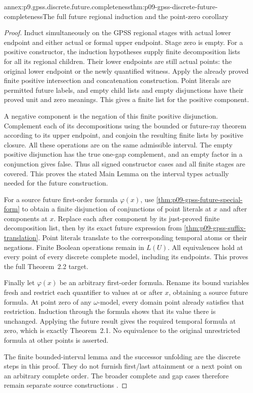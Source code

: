 \begin{annexitem}{annex:p9.gpss.discrete.future.completeness}{thm:p09-gpss-discrete-future-completeness}{The full future regional induction and the point-zero corollary}
\begin{proof}
Induct simultaneously on the GPSS
regional stages with actual lower
endpoint and either actual or
formal upper endpoint. Stage zero
is empty. For a positive
constructor, the induction hypotheses
supply finite decomposition lists
for all its regional children.
Their lower endpoints are still
actual points: the original
lower endpoint or the newly
quantified witness. Apply the
already proved finite positive
intersection and concatenation
construction. Point literals
are permitted future labels,
and empty child lists and
empty disjunctions have their
proved unit and zero meanings.
This gives a finite list for
the positive component.

A negative component is the
negation of this finite
positive disjunction. Complement
each of its decompositions
using the bounded or future-ray
theorem according to its upper
endpoint, and conjoin the
resulting finite lists by
positive closure. All these
operations are on the same
admissible interval. The empty
positive disjunction has the
true one-gap complement, and
an empty factor in a conjunction
gives false. Thus all signed
constructor cases and all
finite stages are covered.
This proves the stated Main
Lemma on the interval types
actually needed for the
future construction.

For a source future first-order
formula \(\varphi(x)\), use
\cref{thm:p09-gpss-future-special-form}
to obtain a finite disjunction
of conjunctions of point literals
at \(x\) and after components
at \(x\). Replace each after
component by its just-proved
finite decomposition list,
then by its exact future
expression from
\cref{thm:p09-gpss-suffix-translation}.
Point literals translate to
the corresponding temporal
atoms or their negations.
Finite Boolean operations
remain in \(L(U)\). All
equivalences hold at every
point of every discrete
complete model, including
its endpoints. This proves
the full Theorem~2.2 target.

Finally let \(\varphi(x)\)
be an arbitrary first-order
formula. Rename its bound
variables fresh and restrict
each quantifier to values
at or after \(x\), obtaining
a source future formula.
At point zero of any
\(\omega\)-model, every
domain point already satisfies
that restriction. Induction
through the formula shows
that its value there is
unchanged. Applying the
future result gives the
required temporal formula
at zero, which is exactly
Theorem~2.1. No equivalence
to the original unrestricted
formula at other points is
asserted.

The finite bounded-interval
lemma and the successor
unfolding are the discrete
steps in this proof. They
do not furnish first/last
attainment or a next point
on an arbitrary complete
order. The broader complete
and gap cases therefore
remain separate source
constructions
\cite[pp.~170--171]{GabbayPnueliShelahStavi1980}.
\end{proof}
\end{annexitem}
